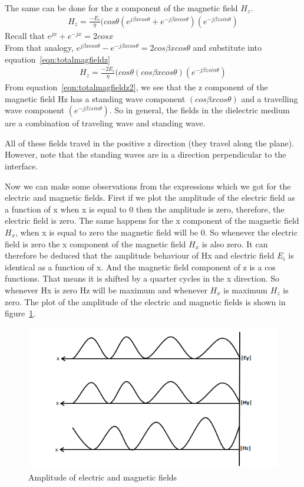 The same can be done for the z component of the magnetic field $H_z$.
\begin{align}
H_z = \frac{-E_i}{\eta}(cos\theta(e^{j\beta xcos\theta} + e^{-j\beta xcos\theta}) (e^{-j\beta zsin\theta})
\label{eqn:totalmagfieldz}
\end{align}  
Recall that $e^{jx} + e^{-jx} = 2cosx$\\
From that analogy, $e^{j\beta xcos \theta} - e^{-j\beta xcos\theta} = 2cos\beta xcos\theta$ and substitute into equation~\eqref{eqn:totalmagfieldz}
\begin{align}
H_z = \frac{-2E_i}{\eta}(cos\theta(cos\beta xcos\theta) (e^{-j \beta zsin\theta})
\label{eqn:totalmagfieldz2}
\end{align}
From equation~\eqref{eqn:totalmagfieldz2}, we see that the z component of the magnetic field Hz has a standing wave component $(cos\beta xcos\theta)$ and a travelling wave component $(e^{-j\beta zsin\theta})$. So in general, the fields in the dielectric medium are a combination of traveling wave and standing wave.

All of these fields travel in the positive z direction (they travel along the plane). However, note that the standing waves are in a direction perpendicular to the interface.
 
Now we can make some observations from the expressions which we got for the electric and magnetic fields. First if we plot the amplitude of the electric field as a function of x when x is equal to 0 then the amplitude is zero, therefore, the electric field is zero. The same happens for the x component of the magnetic field $H_x$, when x is equal to zero the magnetic field will be 0. So whenever the electric field is zero the x component of the magnetic field $H_x$ is also zero. It can therefore be deduced that the amplitude behaviour of Hx and electric field $E_i$ is identical as a function of x. And the magnetic field component of z is a cos functions. That means it is shifted by a quarter cycles in the x direction. So whenever Hx is zero Hz will be maximum and whenever $H_x$ is maximum $H_z$ is zero. The plot of the amplitude of the electric and magnetic fields is shown in figure~\ref{fig:amplitude}.
\begin{figure}[h]
\centering
\includegraphics[width=1\linewidth]{./graphics/amplitude.png}
\caption{Amplitude of electric and magnetic fields}
\label{fig:amplitude}
\end{figure}

